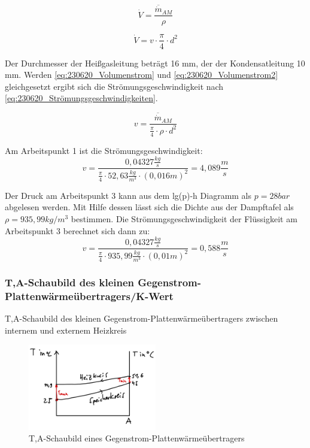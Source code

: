 \begin{equation}
    \dot{V}= \frac{\overline{\dot m}_{AM}}{\rho }
    \label{eq:230620_Volumenstrom}
\end{equation}

\begin{equation}
    \dot{V}= v \cdot \frac{\pi}{4} \cdot d^2
    \label{eq:230620_Volumenstrom2}
\end{equation}

Der Durchmesser der Heißgasleitung beträgt 16 mm, der der Kondensatleitung 10
mm.
Werden \autoref{eq:230620_Volumenstrom} und \autoref{eq:230620_Volumenstrom2} gleichgesetzt ergibt sich die Strömungsgeschwindigkeit nach \autoref{eq:230620_Strömungsgeschwindigkeiten}.

\begin{equation}
    v = \frac{\overline{\dot m}_{AM}}{\frac{\pi}{4}\cdot \rho \cdot d^2}
    \label{eq:230620_Strömungsgeschwindigkeiten}
\end{equation}

Am Arbeitspunkt 1 ist die Strömungsgeschwindigkeit:
$$v=\frac{0,04327 \frac{kg}{s}}{\frac{\pi}{4}\cdot 52,63 \frac{kg}{m^3} \cdot (0,016 m)^2}=4,089 \frac{m}{s} $$

Der Druck am Arbeitspunkt 3 kann aus dem lg(p)-h Diagramm als $p=28 bar$ abgelesen werden. Mit Hilfe dessen lässt sich die Dichte aus der Dampftafel als $\rho=935,99 kg/m^3$ bestimmen.
Die Strömungsgeschwindigkeit der Flüssigkeit am Arbeitspunkt 3 berechnet sich dann zu:
$$v=\frac{0,04327 \frac{kg}{s}}{\frac{\pi}{4}\cdot 935,99\frac{kg}{m^3} \cdot (0,01 m)^2}=0,588 \frac{m}{s}$$

\subsubsection{T,A-Schaubild des kleinen Gegenstrom-Plattenwärmeübertragers/K-Wert}

T,A-Schaubild des kleinen Gegenstrom-Plattenwärmeübertragers
zwischen internem und externem Heizkreis

\begin{figure}[!ht]
    \centering
    \includegraphics[width=0.5\textwidth]{Abbildungen/TA.Diagramm.jpeg}
    \caption{T,A-Schaubild eines Gegenstrom-Plattenwärmeübertragers}
    \label{fig:TA,Diagramm}
\end{figure}

